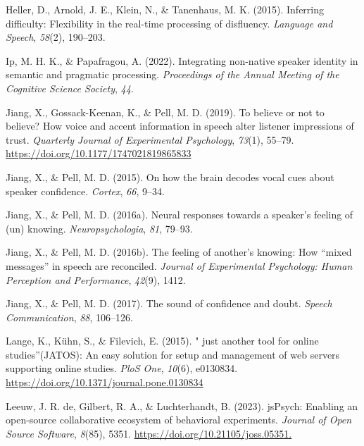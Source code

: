 \documentclass[
  man,floatsintext]{apa7}
\newlength{\cslhangindent}
\newlength{\cslentryspacingunit} %
\newenvironment{CSLReferences}[2] %
 {%
  \setlength{\parindent}{0pt}
  \ifodd #1
  \let\oldpar\par
  \def\par{\hangindent=\cslhangindent\oldpar}
  \fi
  \setlength{\parskip}{#2\cslentryspacingunit}
 }%
 {}
\begin{document}
\begin{CSLReferences}{1}{0}
\leavevmode{}%
Heller, D., Arnold, J. E., Klein, N., \& Tanenhaus, M. K. (2015). Inferring difficulty: Flexibility in the real-time processing of disfluency. \emph{Language and Speech}, \emph{58}(2), 190--203.

\leavevmode{}%
Ip, M. H. K., \& Papafragou, A. (2022). Integrating non-native speaker identity in semantic and pragmatic processing. \emph{Proceedings of the Annual Meeting of the Cognitive Science Society}, \emph{44}.

\leavevmode{}%
Jiang, X., Gossack-Keenan, K., \& Pell, M. D. (2019). To believe or not to believe? {How voice and accent information in speech alter listener impressions of trust}. \emph{Quarterly Journal of Experimental Psychology}, \emph{73}(1), 55--79. \url{https://doi.org/10.1177/1747021819865833}

\leavevmode{}%
Jiang, X., \& Pell, M. D. (2015). On how the brain decodes vocal cues about speaker confidence. \emph{Cortex}, \emph{66}, 9--34.

\leavevmode{}%
Jiang, X., \& Pell, M. D. (2016a). Neural responses towards a speaker's feeling of (un) knowing. \emph{Neuropsychologia}, \emph{81}, 79--93.

\leavevmode{}%
Jiang, X., \& Pell, M. D. (2016b). The feeling of another's knowing: How {``mixed messages''} in speech are reconciled. \emph{Journal of Experimental Psychology: Human Perception and Performance}, \emph{42}(9), 1412.

\leavevmode{}%
Jiang, X., \& Pell, M. D. (2017). The sound of confidence and doubt. \emph{Speech Communication}, \emph{88}, 106--126.

\leavevmode{}%
Lange, K., Kühn, S., \& Filevich, E. (2015). " just another tool for online studies''(JATOS): An easy solution for setup and management of web servers supporting online studies. \emph{PloS One}, \emph{10}(6), e0130834. \url{https://doi.org/10.1371/journal.pone.0130834}

\leavevmode{}%
Leeuw, J. R. de, Gilbert, R. A., \& Luchterhandt, B. (2023). jsPsych: Enabling an open-source collaborative ecosystem of behavioral experiments. \emph{Journal of Open Source Software}, \emph{8}(85), 5351. \url{https://doi.org/10.21105/joss.05351.}


\end{CSLReferences}
\end{document}
